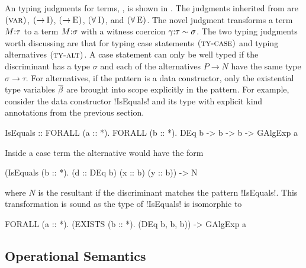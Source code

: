 \documentclass[manuscript,screen,nonacm]{acmart}
\begin{document}
An typing judgments for terms, \fbox{$\Typing \TEnv \Tm \tau$}, is shown in . The judgments inherited from \SF are $\textsc{(var)}$, $\textsc{(\ensuremath{\mathord{\to}}\!~I)}$, $\textsc{(\ensuremath{\mathord{\to}}\!~E)}$, $\textsc{(\ensuremath{\mathord{\forall}}\!~I)}$, and $\textsc{(\ensuremath{\mathord{\forall}}\!~E)}$. The novel judgment  transforms a term $M{:}\tau$ to a term $M{:}\sigma$ with a witness coercion $\gamma{:}\tau\sim\sigma$. The two typing judgments worth discussing are that for typing case statements $\textsc{(ty-case)}$ and typing alternatives $\textsc{(ty-alt)}$. A case statement can only be well typed if the discriminant has a type $\sigma$ and each of the alternatives $P \to N$ have the same type $\sigma \to \tau$. For alternatives, if the pattern is a data constructor, only the existential type variables $\overline{\beta}$ are brought into scope explicitly in the pattern. 
For example, consider the data constructor !IsEquals! and its type with explicit kind annotations from the previous section.
\begin{CenteredBox}
\begin{code}
IsEquals :: FORALL (a :: *). FORALL (b :: *). DEq b -> b -> b -> GAlgExp a
\end{code}
\end{CenteredBox}

Inside a case term the alternative would have the form

\begin{CenteredBox}
\begin{code}
(IsEquals (b :: *). (d :: DEq b) (x :: b) (y :: b)) -> N
\end{code}
\end{CenteredBox}

where $N$ is the resultant if the discriminant matches the pattern !IsEquals!.
This transformation is sound as the type of !IsEquals! is isomorphic to

\begin{CenteredBox}
\begin{code}
FORALL (a :: *). (EXISTS (b :: *). (DEq b, b, b)) -> GAlgExp a
\end{code}
\end{CenteredBox}

\subsection{Operational Semantics}
\newcommand{\Beta}{
 \ib{\irule[\trule{$\beta$}]
 {};
 {$\stepsto {(\Lam {x\co\tau} M) \App N} {\Set{x\mapsto N}M}$}
 }
}
\newcommand{\TBeta}{
 \ib{\irule[\trule{Ty-$\beta$}]
 {};
 {$\stepsto {(\TLam \TyVar M) \App \tau} {\Set{\TyVar\mapsto \tau}M}$}
 }
}
\newcommand{\CaseE}{
 \ib{\irule[\trule{case}]
 {};
 {\stepsto {\Case {(K \many\sigma\many\phi\many\Tm)} {\Set{...; K\App\many\beta\App\many x \to N; ...}}} {\Set{\many {\beta\mapsto\phi}, \many{x\mapsto\Tm}}N}}
 }
}
\newcommand{\CoTransE}{
 \ib{\irule[\trule{Co-Trans}]
 {};
 {$\stepsto {\Cast {(\Cast \Val \Co)} {\nu}} {\Cast \Val {(\trans{\Co} {\nu})}}$}
 }
}
\end{document}

